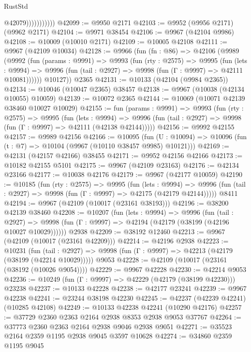 \begin{lexlean}{RustStd}
\begin{coremodule}
                          @42079)))))))))))
@42099 := @9950 @2171
@42103 := @9952 (@9956 @2171) (@9962 @2171)
@42104 := @9971 @38454
@42106 := @9967 (@42104 @9986)
@42108 := @10009 (@10010 @2171)
@42109 := @10005 @42108
@42111 := @9967 (@42109 @10034)
@42128 := @9966
    (fun (fn : @86) =>
    @42106
      (@9989
        (@9992
          (fun (params : @9991) =>
          @9993
            (fun (rty : @2575) =>
            @9995
              (fun (lets : @9994) =>
              @9996 (fun (tail : @2927) => @9998 (fun (Γ : @9997) => @42111 @10081))))))
        @10127))
    @2365
@42131 := @10133 (@42104 (@9984 @2365))
@42134 := @10046 (@10047 @2365) @38457
@42138 := @9967 (@10038 (@42134 @10055) @10059)
@42139 := @10072 @2365
@42144 := @10069 (@10071 @42139 @38460 @10027 @10029)
@42155 := fun (params : @9991) =>
  @9993
    (fun (rty : @2575) =>
    @9995
      (fun (lets : @9994) =>
      @9996 (fun (tail : @2927) => @9998 (fun (Γ : @9997) => @42111 (@42138 @42144)))))
@42156 := @9992 @42155
@42157 := @9989 @42156
@42166 := @10095
    (fun (U : @10094) => @10096 (fun (t : @7) => @10104 (@9967 (@10110 @38457 @9985) @10121)))
@42169 := @42131 (@42157 @42166) @38455
@42171 := @9952 @42156 @42166
@42173 := @10182 @42155 @5101
@42175 := @9967 (@42109 @23163)
@42176 := @42134 @23166
@42177 := @10038 @42176
@42179 := @9967 (@42177 @10059)
@42190 := @10185
    (fun (rty : @2575) =>
    @9995
      (fun (lets : @9994) =>
      @9996 (fun (tail : @2927) => @9998 (fun (Γ : @9997) => @42175 (@42179 @42144)))))
    @8411
@42194 := @9967 (@42109 (@10017 (@23161 @38193)))
@42196 := @38200 @42139 @38460
@42208 := @10207
    (fun (lets : @9994) =>
    @9996
      (fun (tail : @2927) =>
      @9998 (fun (Γ : @9997) => @42194 (@42179 (@38199 (@42196 @10027 @10029))))))
    @2938
@42209 := @38192 @12460
@42213 := @9967 (@42109 (@10017 (@23161 @42209)))
@42214 := @42196 @2938
@42223 := @10231
    (fun (tail : @2927) => @9998 (fun (Γ : @9997) => @42213 (@42179 (@38199 (@42214 @10029)))))
    @9053
@42228 := @42109 (@10017 (@23161 (@38192 (@10026 @9054))))
@42229 := @9967 @42228
@42230 := @42214 @9053
@42236 := @10249 (fun (Γ : @9997) => @42229 (@42179 (@38199 @42230))) @23238
@42237 := @10133 @42228
@42238 := @42177 @23241
@42239 := @9967 @42238
@42241 := @23244 @38198 @42230
@42245 := @42237 (@42239 @42241) (@10285 @42108)
@42249 := @10133 @42238 @42241 (@10290 @42176)
@42257 := @37729 @2360 @2363 @2164 @2938 @8353 @2938 @9053 @37767
@42264 := @37773 @2360 @2363 @2164 @2938 @9046 @2938 @9051
@42271 := @35523 @2164 @2359 @1195 @2938 @9045 @3597 @10628
@42274 := @34860 @2359 @1195 @9045

\end{coremodule}
\end{lexlean}
